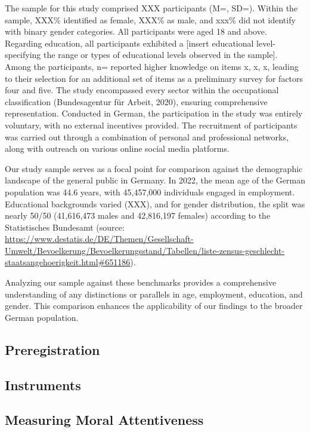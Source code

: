 \documentclass[
  12pt,
  a4paper,
  twoside]{article}
\begin{document}
The sample for this study comprised XXX participants (M=, SD=). Within the sample, XXX\% identified as female, XXX\% as male, and xxx\% did not identify with binary gender categories. All participants were aged 18 and above. Regarding education, all participants exhibited a {[}insert educational level- specifying the range or types of educational levels observed in the sample{]}. Among the participants, n= reported higher knowledge on items x, x, x, leading to their selection for an additional set of items as a preliminary survey for factors four and five.
The study encompassed every sector within the occupational classification (Bundesagentur für Arbeit, 2020), ensuring comprehensive representation. Conducted in German, the participation in the study was entirely voluntary, with no external incentives provided. The recruitment of participants was carried out through a combination of personal and professional networks, along with outreach on various online social media platforms.

Our study sample serves as a focal point for comparison against the demographic landscape of the general public in Germany. In 2022, the mean age of the German population was 44.6 years, with 45,457,000 individuals engaged in employment. Educational backgrounds varied (XXX), and for gender distribution, the split was nearly 50/50 (41,616,473 males and 42,816,197 females) according to the Statistisches Bundesamt (source: \url{https://www.destatis.de/DE/Themen/Gesellschaft-Umwelt/Bevoelkerung/Bevoelkerungsstand/Tabellen/liste-zensus-geschlecht-staatsangehoerigkeit.html\#651186}).

Analyzing our sample against these benchmarks provides a comprehensive understanding of any distinctions or parallels in age, employment, education, and gender. This comparison enhances the applicability of our findings to the broader German population.

\hypertarget{preregistration}{%
\subsection{Preregistration}\label{preregistration}}

\hypertarget{instruments}{%
\subsection{Instruments}\label{instruments}}

\hypertarget{measuring-moral-attentiveness}{%
\subsection{Measuring Moral Attentiveness}\label{measuring-moral-attentiveness}}
\end{document}
